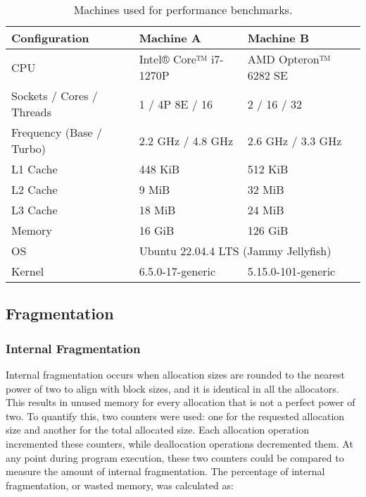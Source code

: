 \begin{table}[h]
    \begin{tabular}{lll}
        \textbf{Configuration}    & \textbf{Machine A}                                       & \textbf{Machine B}   \\ \hline
        CPU                       & Intel® Core™ i7-1270P                                    & AMD Opteron™ 6282 SE \\ \hline
        Sockets / Cores / Threads & 1 / 4P 8E / 16                                           & 2 / 16 / 32          \\ \hline
        Frequency (Base / Turbo)  & 2.2 GHz / 4.8 GHz                                        & 2.6 GHz / 3.3 GHz    \\ \hline
        L1 Cache                  & 448 KiB                                                  & 512 KiB              \\ \hline
        L2 Cache                  & 9 MiB                                                    & 32 MiB               \\ \hline
        L3 Cache                  & 18 MiB                                                   & 24 MiB               \\ \hline
        Memory                    & 16 GiB                                                   & 126 GiB              \\ \hline
        OS                        & \multicolumn{2}{l}{Ubuntu 22.04.4 LTS (Jammy Jellyfish)}                        \\ \hline
        Kernel                    & 6.5.0-17-generic                                         & 5.15.0-101-generic   \\
    \end{tabular}
    \centering
    \caption{Machines used for performance benchmarks.}
    \label{table:performancespecs}
\end{table}

\subsection{Fragmentation} \label{sec:frageval}
\subsubsection{Internal Fragmentation}
Internal fragmentation occurs when allocation sizes are rounded to the nearest power of two to align with block sizes, and it is identical in all the allocators. This results in unused memory for every allocation that is not a perfect power of two. To quantify this, two counters were used: one for the requested allocation size and another for the total allocated size. Each allocation operation incremented these counters, while deallocation operations decremented them. At any point during program execution, these two counters could be compared to measure the amount of internal fragmentation. The percentage of internal fragmentation, or wasted memory, was calculated as:

